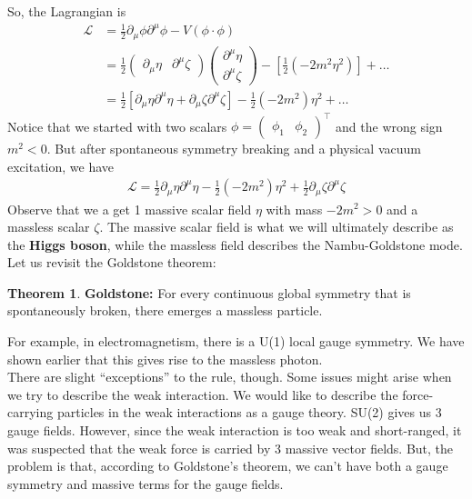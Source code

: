 \documentclass[a4paper,11pt]{article}
\numberwithin{equation}{section}
\theoremstyle{definition}
\newtheorem{thm}{Theorem}[section]
\newcommand{\p}{\partial}
\newcommand{\lag}{\mathcal{L}}
\begin{document}
So, the Lagrangian is
\begin{align}
\lag &= \frac{1}{2}\p_\mu\phi\p^\mu\phi - V(\phi \cdot \phi)\\
&= \frac{1}{2}\begin{pmatrix}
\p_\mu\eta & \p^\mu\zeta
\end{pmatrix}
\begin{pmatrix}
\p^\mu\eta\\ \p^\mu\zeta
\end{pmatrix} - \left[\frac{1}{2}(-2m^2\eta^2)\right] + \dots\\
&= \frac{1}{2}\left[\p_\mu\eta \p^\mu\eta + \p_\mu\zeta \p^\mu\zeta\right] - \frac{1}{2}(-2m^2)\eta^2+\dots
\end{align}
Notice that we started with two scalars $\phi = \begin{pmatrix}
\phi_1&\phi_2
\end{pmatrix}^\top$ and the wrong sign $m^2 < 0$. But after spontaneous symmetry breaking and a physical vacuum excitation, we have
\begin{align}
\lag = \boxed{\frac{1}{2}\p_\mu\eta \p^\mu\eta - \frac{1}{2}(-2m^2)\eta^2} + \boxed{\frac{1}{2}\p_\mu\zeta \p^\mu\zeta}
\end{align}
Observe that we a get 1 massive scalar field $\eta$ with mass $-2m^2 > 0$ and a massless scalar $\zeta$. The massive scalar field is what we will ultimately describe as the \textbf{Higgs boson}, while the massless field describes the Nambu-Goldstone mode. Let us revisit the Goldstone theorem:\\

\begin{thm}
	\textbf{Goldstone:} For every continuous global symmetry that is spontaneously broken, there emerges a massless particle. 
\end{thm}

For example, in electromagnetism, there is a U(1) local gauge symmetry. We have shown earlier that this gives rise to the massless photon.\\

There are slight ``exceptions'' to the rule, though. Some issues might arise when we try to describe the weak interaction. We would like to describe the force-carrying particles in the weak interactions as a gauge theory. SU(2) gives us 3 gauge fields. However, since the weak interaction is too weak and short-ranged, it was suspected that the weak force is carried by 3 massive vector fields. But, the problem is that, according to Goldstone's theorem, we can't have both a gauge symmetry and massive terms for the gauge fields. \\
\end{document}
